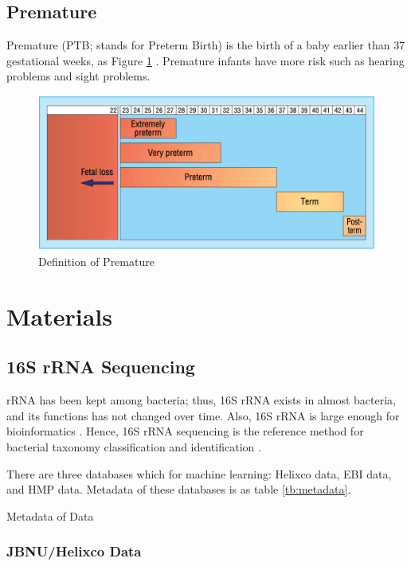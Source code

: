 \documentclass[a4paper]{article}
\begin{document}
        \subsection{Premature}
            Premature (PTB; stands for Preterm Birth) is the birth of a baby earlier than 37 gestational weeks, as Figure \ref{fig:ptb} \cite{premature1}. Premature infants have more risk such as hearing problems and sight problems.

            \begin{figure}[p]
                \centering
                \includegraphics[width=0.4 \linewidth]{figures/premature.png}
                \caption{Definition of Premature \protect \cite{premature1}}
                \label{fig:ptb}
            \end{figure}

    \section{Materials}
        \subsection{16S rRNA Sequencing}
            rRNA has been kept among bacteria; thus, 16S rRNA exists in almost bacteria, and its functions has not changed over time. Also, 16S rRNA is large enough for bioinformatics \cite{16S2}. Hence, 16S rRNA sequencing is the reference method for bacterial taxonomy classification and identification \cite{16S1}.

            There are three databases which for machine learning: Helixco data, EBI data, and HMP data. Metadata of these databases is as table \ref{tb:metadata}.

            \begin{table}[p]
                \centering
                \caption{Metadata of Data}
                \label{tb:metadata}
                
            \end{table}

            \subsubsection{JBNU/Helixco Data}
\end{document}
